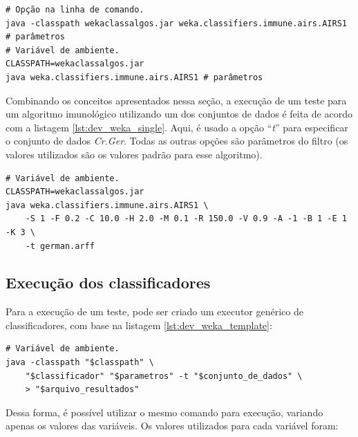 \vspace{0.5cm}
\begin{lstlisting}[caption=Execução de um algoritmo do pacote de algoritmos imunológicos, label=lst:dev_weka_airs]
# Opção na linha de comando.
java -classpath wekaclassalgos.jar weka.classifiers.immune.airs.AIRS1 # parâmetros
# Variável de ambiente.
CLASSPATH=wekaclassalgos.jar
java weka.classifiers.immune.airs.AIRS1 # parâmetros
\end{lstlisting}
\vspace{0.5cm}

Combinando os conceitos apresentados nessa seção, a execução de um teste para um algoritmo imunológico utilizando um dos conjuntos de dados é feita de acordo com a listagem \ref{lst:dev_weka_single}. Aqui, é usado a opção ``\emph{t}'' para especificar o conjunto de dados \emph{Cr.Ger}. Todas as outras opções são parâmetros do filtro (os valores utilizados são os valores padrão para esse algoritmo).

\vspace{0.5cm}
\begin{lstlisting}[caption=Execução de um algoritmo do pacote de algoritmos imunológicos utilizando um dos conjuntos de dados, label=lst:dev_weka_single]
# Variável de ambiente.
CLASSPATH=wekaclassalgos.jar
java weka.classifiers.immune.airs.AIRS1 \
    -S 1 -F 0.2 -C 10.0 -H 2.0 -M 0.1 -R 150.0 -V 0.9 -A -1 -B 1 -E 1 -K 3 \
    -t german.arff
\end{lstlisting}
\vspace{0.5cm}

\subsection{Execução dos classificadores}

Para a execução de um teste, pode ser criado um executor genérico de classificadores, com base na listagem \ref{lst:dev_weka_template}:

\vspace{0.5cm}
\begin{lstlisting}[caption=Execução genérica de um classificador, label=lst:dev_weka_template]
# Variável de ambiente.
java -classpath "$classpath" \
    "$classificador" "$parametros" -t "$conjunto_de_dados" \
    > "$arquivo_resultados"
\end{lstlisting}
\vspace{0.5cm}

Dessa forma, é possível utilizar o mesmo comando para execução, variando apenas os valores das variáveis. Os valores utilizados para cada variável foram:

